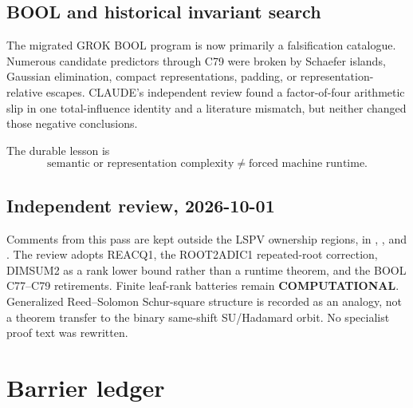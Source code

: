 \documentclass[11pt]{article}
\begin{document}
\subsection{BOOL and historical invariant search}

The migrated GROK BOOL program is now primarily a falsification catalogue. Numerous candidate
predictors through C79 were broken by Schaefer islands, Gaussian elimination, compact
representations, padding, or representation-relative escapes. CLAUDE's independent review found a
factor-of-four arithmetic slip in one total-influence identity and a literature mismatch, but neither
changed those negative conclusions.

The durable lesson is
\[
\boxed{\text{semantic or representation complexity}\ne\text{forced machine runtime}.}
\]

\subsection{Independent review, 2026-10-01}

Comments from this pass are kept outside the LSPV ownership regions, in
, , and .
The review adopts REACQ1, the ROOT2ADIC1 repeated-root correction, DIMSUM2 as a
rank lower bound rather than a runtime theorem, and the BOOL C77--C79 retirements.
Finite leaf-rank batteries remain \textbf{COMPUTATIONAL}. Generalized Reed--Solomon
Schur-square structure is recorded as an analogy, not a theorem transfer to the
binary same-shift SU/Hadamard orbit. No specialist proof text was rewritten.

\section{Barrier ledger}
\end{document}
